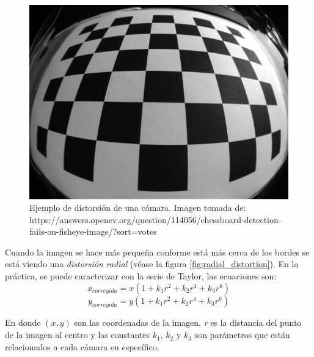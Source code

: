 \begin{figure}
\centering
\includegraphics[scale=0.5]{images/image_distorted.png}
\caption{Ejemplo de distorsión de una cámara. Imagen tomada de: https://answers.opencv.org/question/114056/chessboard-detection-fails-on-fisheye-image/?sort=votes}
\label{fig:image_distorted}
\end{figure}

Cuando la imagen se hace más pequeña conforme está más cerca de los bordes se está viendo una \textit{distorsión radial} (véase la figura \ref{fig:radial_distortion}). En la práctica, se puede caracterizar con la serie de Taylor, las ecuaciones son:
\[x_{corregida} = x(1+k_1r^2+k_2r^4+k_3r^6)\]
\[y_{corregida} = y(1+k_1r^2+k_2r^4+k_3r^6)\]

En donde $(x,y)$ son las coordenadas de la imagen, \textit{r} es la distancia del punto de la imagen al centro y las constantes $k_1$, $k_2$ y $k_3$ son parámetros que están relacionados a cada cámara en específico.

